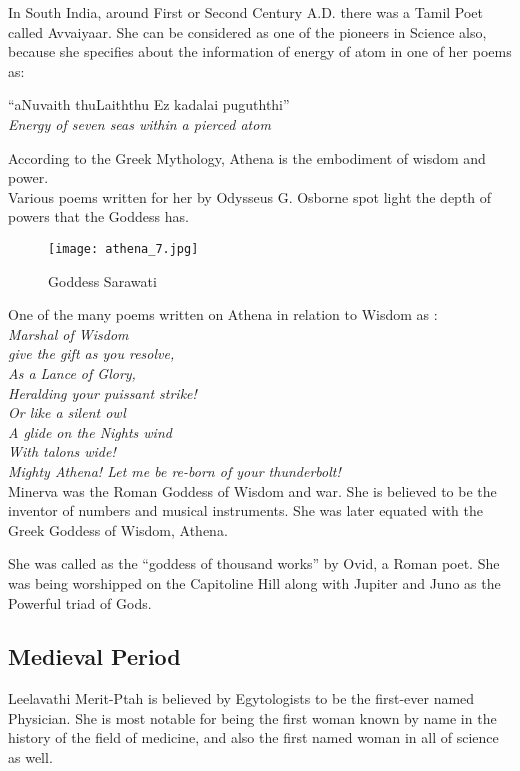 \documentclass[a4paper,10pt]{article}
\begin{document}
In South India, around First or Second Century A.D. there was a Tamil Poet called Avvaiyaar. She can be considered as one of the pioneers in Science also, because she specifies about the information of energy of atom in one of her poems as: \\
\begin{center}
``aNuvaith thuLaiththu Ez kadalai puguththi'' \\
\textit{Energy of seven seas within a pierced atom}\\
\end{center}
\newblock
According to the Greek Mythology, Athena is the embodiment of wisdom and power.\\
Various poems written for her by Odysseus G. Osborne spot light the depth of powers that the Goddess has.\\
\begin{center}
\begin{figure}[h]
\centering
 \texttt{[image: athena\_7.jpg]}
 \caption{Goddess Sarawati}
\end{figure}
\end{center}

One of the many poems written on Athena in relation to Wisdom as \cite{athena}:\\


\textit{Marshal of Wisdom}\\
\textit{give the gift as you resolve,}\\
\textit{As a Lance of Glory,}\\
\textit{Heralding your puissant strike!}\\
\textit{Or like a silent owl}\\
\textit{A glide on the Nights wind}\\
\textit{With talons wide!}\\
\textit{Mighty Athena! Let me be re-born of your thunderbolt!}\\

\newblock
Minerva was the Roman Goddess of Wisdom and war. She is believed to be the inventor of numbers and musical instruments. She was later equated with the Greek Goddess of Wisdom, Athena.

She was called as the “goddess of thousand works” by Ovid, a Roman poet. She was being worshipped on the Capitoline Hill along with Jupiter and Juno as the Powerful triad of Gods.

\subsection{Medieval Period}
Leelavathi
\newblock
Merit-Ptah is believed by Egytologists to be the first-ever named Physician. She is most notable for being the first woman known by name in the history of the field of medicine, and also the first named woman in all of science as well.\\
\end{document}
